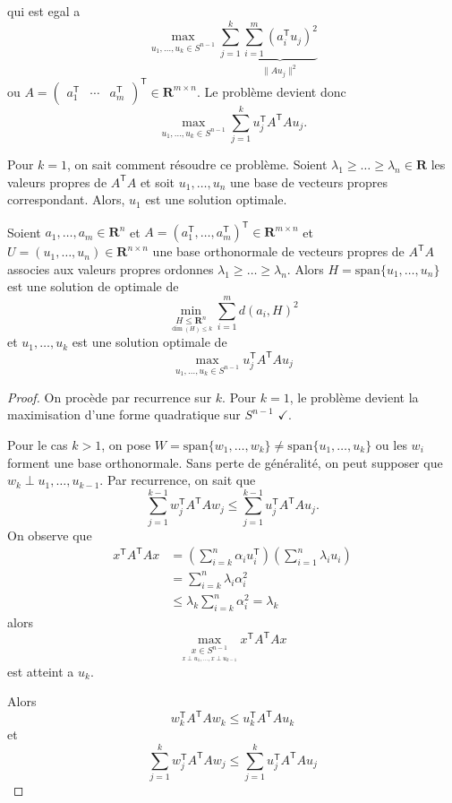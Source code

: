 qui est egal a 
$$
\max_{u_{1},\dots,u_{k}\in S^{n-1}}\sum_{j=1}^{k} \underbrace{ \sum_{i=1}^{m} (a_{i}^{\mathsf{T}}u_{j})^{2} }_{ \lVert Au_{j} \rVert ^{2} }
$$
ou $A=\begin{pmatrix}a_{1}^{\mathsf{T}} & \cdots & a_{m}^{\mathsf{T}}\end{pmatrix}^{\mathsf{T}}\in \mathbf{R}^{m\times n}$. Le problème devient donc
$$
\max_{u_{1},\dots,u_{k}\in S^{n-1}}\sum_{j=1}^{k} u_{j}^{\mathsf{T}}A^{\mathsf{T}}Au_{j}.
$$
\begin{remark}
Pour $k=1$, on sait comment résoudre ce problème. Soient $\lambda_{1}\ge \dots\ge \lambda _{n}\in \mathbf{R}$ les valeurs propres de $A^{\mathsf{T}}A$ et soit $u_{1},\dots,u_{n}$ une base de vecteurs propres correspondant. Alors, $u_{1}$ est une solution optimale.
\end{remark}
\begin{theorem}
Soient $a_{1},\dots,a_{m}\in \mathbf{R}^{n}$ et $A=(a_{1}^{\mathsf{T}},\dots,a_{m}^{\mathsf{T}})^{\mathsf{T}}\in \mathbf{R}^{m\times n}$ et $U=(u_{1},\dots,u_{n})\in \mathbf{R}^{n\times n}$ une base orthonormale de vecteurs propres de $A^{\mathsf{T}}A$ associes aux valeurs propres ordonnes $\lambda_{1}\ge\dots\ge\lambda _{n}$. Alors $H=\mathrm{span}\{ u_{1},\dots,u_{n} \}$ est une solution de optimale de
\begin{equation}\label{probone}
\min_{\underset{\dim(H)\le k}{H\le \mathbf{R}^{n}}}\sum_{i=1}^{m} d(a_{i},H)^{2}
\end{equation}
et $u_{1},\dots,u_{k}$ est une solution optimale de
\begin{equation}\label{probthree}
\max_{u_{1},\dots,u_{k}\in S^{n-1}} u_{j}^{\mathsf{T}}A^{\mathsf{T}}Au_{j}
\end{equation}
\end{theorem}
\begin{proof}
On procède par recurrence sur $k$. Pour $k=1$, le problème devient la maximisation d'une forme quadratique sur $S^{n-1}$ $\checkmark$. 

Pour le cas $k>1$, on pose $W=\mathrm{span}\{ w_{1},\dots,w_{k} \}\neq \mathrm{span}\{ u_{1},\dots,u_{k} \}$ ou les $w_{i}$ forment une base orthonormale. Sans perte de généralité, on peut supposer que $w_{k}\perp u_{1},\dots,u_{k-1}$. Par recurrence, on sait que 
$$
\sum_{j=1}^{k-1} w_{j}^{\mathsf{T}}A^{\mathsf{T}}Aw_{j}\le \sum_{j=1}^{k-1} u_{j}^{\mathsf{T}}A^{\mathsf{T}}Au_{j}.
$$
On observe que
\begin{align*}
x^{\mathsf{T}}A^{\mathsf{T}}Ax & =\left( \sum_{i=k}^{n} \alpha _{i}u_{i}^{\mathsf{T}} \right)\left( \sum_{i=1}^{n}\lambda _{i}u_{i}  \right) \\
 & =\sum_{i=k}^{n} \lambda _{i}\alpha _{i}^{2} \\
 & \le \lambda _{k}\sum_{i=k}^{n} \alpha _{i}^{2} =\lambda _{k}
\end{align*}
alors
$$
\max_{\underset{x\perp u_{1},\dots,x\perp u_{k-1}}{x \in S^{n-1}}}x^{\mathsf{T}}A^{\mathsf{T}}Ax
$$
est atteint a $u_{k}$.  

Alors
$$
w_{k}^{\mathsf{T}}A^{\mathsf{T}}Aw_{k}\le u_{k}^{\mathsf{T}}A^{\mathsf{T}}Au_{k}
$$
et 
$$
\sum_{j=1}^{k} w_{j}^{\mathsf{T}}A^{\mathsf{T}}Aw_{j}\le \sum_{j=1}^{k} u_{j}^{\mathsf{T}}A^{\mathsf{T}}Au_{j}
$$
\end{proof}
